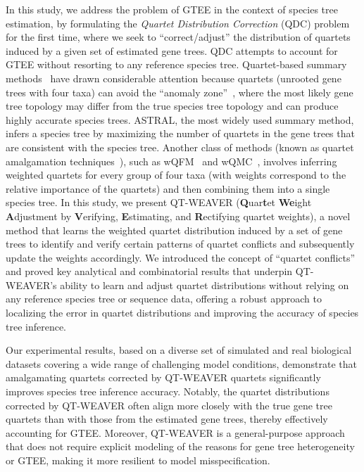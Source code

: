 \documentclass[10pt,a4paper]{article}
\begin{document}
In this study, we address the problem of GTEE in the context of species tree estimation, by formulating the \textit{Quartet Distribution Correction} (QDC) problem for the first time, where we seek to ``correct/adjust'' the distribution of quartets induced by a given set of estimated gene trees. QDC attempts to account for GTEE without resorting to any reference species tree. %
Quartet-based summary methods~\cite{astral,wqfm-tree-rafi2025} have drawn considerable attention because quartets (unrooted gene trees with four taxa) can avoid the ``anomaly zone''~\cite{DR06,DR09,degnan2013anomalous}, where the most likely gene tree topology may differ from the true species tree topology and can produce highly accurate species trees. ASTRAL, the most widely used summary method, infers a species tree by maximizing the number of quartets in the gene trees that are consistent with the species tree. Another class of methods (known as quartet amalgamation techniques~\cite{snir_quartets_2008,qfm,qfm-fi,wqfm,wqmc}), such as wQFM~\cite{wqfm} and wQMC~\cite{wqmc}, involves inferring weighted quartets for every group of four taxa (with weights correspond to the relative importance of the quartets) and then combining them into a single species tree. In this study, we present QT-WEAVER (\textbf{Q}uar\textbf{t}et \textbf{We}ight \textbf{A}djustment by \textbf{V}erifying, \textbf{E}stimating, and \textbf{R}ectifying quartet weights), a novel method that learns the weighted quartet distribution induced by a set of gene trees to identify and verify certain patterns of quartet conflicts and subsequently update the weights accordingly. We introduced the concept of ``quartet conflicts'' and proved key analytical and combinatorial results that underpin QT-WEAVER's ability to learn and adjust quartet distributions without relying on any reference species tree or sequence data, offering a robust approach to localizing the error in quartet distributions and improving the accuracy of species tree inference. 

Our experimental results, based on a diverse set of simulated and real biological datasets covering a wide range of challenging model conditions, demonstrate that amalgamating quartets corrected by QT-WEAVER quartets significantly improves species tree inference accuracy. 
Notably, the quartet distributions corrected by QT-WEAVER often align more closely with the true gene tree quartets than with those from the estimated gene trees, thereby effectively accounting for GTEE. Moreover, QT-WEAVER is a general-purpose approach that does not require explicit modeling of the reasons for gene tree heterogeneity or GTEE, making it more resilient to model misspecification. %
\end{document}
